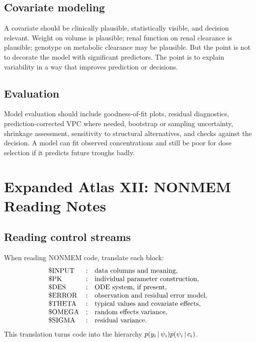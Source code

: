 \subsection{Covariate modeling}

A covariate should be clinically plausible, statistically visible, and decision relevant. Weight on volume is plausible; renal function on renal clearance is plausible; genotype on metabolic clearance may be plausible. But the point is not to decorate the model with significant predictors. The point is to explain variability in a way that improves prediction or decisions.

\subsection{Evaluation}

Model evaluation should include goodness-of-fit plots, residual diagnostics, prediction-corrected VPC where needed, bootstrap or sampling uncertainty, shrinkage assessment, sensitivity to structural alternatives, and checks against the decision. A model can fit observed concentrations and still be poor for dose selection if it predicts future troughs badly.

\section{Expanded Atlas XII: NONMEM Reading Notes}

\subsection{Reading control streams}

When reading NONMEM code, translate each block:
\[
  \begin{array}{lll}
  \$\mathrm{INPUT} &:& \text{data columns and meaning},\\
  \$\mathrm{PK} &:& \text{individual parameter construction},\\
  \$\mathrm{DES} &:& \text{ODE system, if present},\\
  \$\mathrm{ERROR} &:& \text{observation and residual error model},\\
  \$\mathrm{THETA} &:& \text{typical values and covariate effects},\\
  \$\mathrm{OMEGA} &:& \text{random effects variance},\\
  \$\mathrm{SIGMA} &:& \text{residual variance}.
  \end{array}
\]
This translation turns code into the hierarchy \(p(y_i\,|\,\psi_i)p(\psi_i\,|\, c_i)\).

